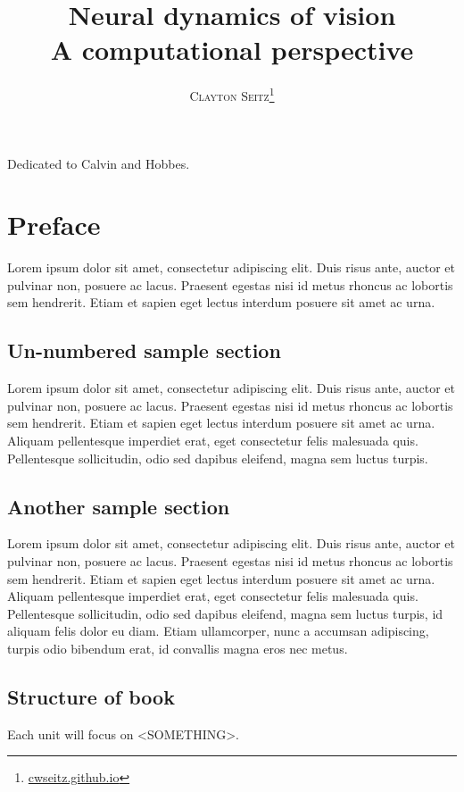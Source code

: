 \documentclass[a4paper,11pt]{book}
\title{\Huge \textbf{Neural dynamics of vision}  \\ \huge A computational perspective}
\author{\textsc{Clayton Seitz}\thanks{\url{cwseitz.github.io}}}
\newenvironment{dedication}
{
   \cleardoublepage
   \thispagestyle{empty}
   \vspace*{\stretch{1}}
   \hfill\begin{minipage}[t]{0.66\textwidth}
   \raggedright
}
{
   \end{minipage}
   \vspace*{\stretch{3}}
   \clearpage
}
\begin{document}
\frontmatter
\maketitle

\begin{dedication}
Dedicated to Calvin and Hobbes.
\end{dedication}

\tableofcontents
\mainmatter

\chapter*{Preface}
Lorem ipsum dolor sit amet, consectetur adipiscing elit. Duis risus ante, auctor et pulvinar non, posuere ac lacus. Praesent egestas nisi id metus rhoncus ac lobortis sem hendrerit. Etiam et sapien eget lectus interdum posuere sit amet ac urna.

\section*{Un-numbered sample section}
Lorem ipsum dolor sit amet, consectetur adipiscing elit. Duis risus ante, auctor et pulvinar non, posuere ac lacus. Praesent egestas nisi id metus rhoncus ac lobortis sem hendrerit. Etiam et sapien eget lectus interdum posuere sit amet ac urna. Aliquam pellentesque imperdiet erat, eget consectetur felis malesuada quis. Pellentesque sollicitudin, odio sed dapibus eleifend, magna sem luctus turpis.

\section*{Another sample section}
Lorem ipsum dolor sit amet, consectetur adipiscing elit. Duis risus ante, auctor et pulvinar non, posuere ac lacus. Praesent egestas nisi id metus rhoncus ac lobortis sem hendrerit. Etiam et sapien eget lectus interdum posuere sit amet ac urna. Aliquam pellentesque imperdiet erat, eget consectetur felis malesuada quis. Pellentesque sollicitudin, odio sed dapibus eleifend, magna sem luctus turpis, id aliquam felis dolor eu diam. Etiam ullamcorper, nunc a accumsan adipiscing, turpis odio bibendum erat, id convallis magna eros nec metus.

\section*{Structure of book}
Each unit will focus on <SOMETHING>.
\end{document}
